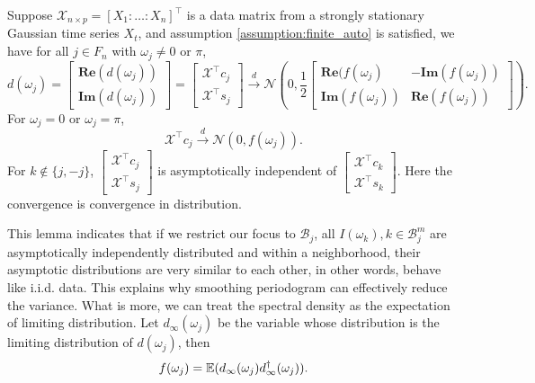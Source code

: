 \begin{lem}
\label{lemma:asy_dis_dft}
Suppose $\mathcal{\mathcal{X}}_{n\times p} = [X_1:\ldots:X_n]^\top$ is a data matrix from a strongly stationary  Gaussian time series $X_t$, and assumption \ref{assumption:finite_auto} is satisfied, we have for all $j\in F_n$ with $\omega_j \neq 0$ or $\pi$, 
\begin{equation}
\label{eq:limiting_dist}
d(\omega_j) = 
\begin{bmatrix}
\mathbf{Re}(d(\omega_j))\\
\mathbf{Im}(d(\omega_j))
\end{bmatrix}=
\begin{bmatrix} 
\mathcal{X}^\top c_j\\
\mathcal{X}^\top s_j
\end{bmatrix}  \overset{d}{\rightarrow} \mathcal{N}\left(0, \frac{1}{2}\begin{bmatrix}
\mathbf{Re}(f(\omega_j) & -\mathbf{Im}(f(\omega_j))\\
\mathbf{Im}(f(\omega_j)) & \mathbf{Re}(f(\omega_j))
\end{bmatrix}
\right).
\end{equation}
For $\omega_j = 0$ or $\omega_j = \pi$, 
\begin{equation}
\mathcal{X}^\top c_j
\overset{d}{\rightarrow} \mathcal{N}\left(0, f(\omega_j)
\right).
\end{equation}
For $k \notin \{j, -j\}$,  
$\begin{bmatrix}
\mathcal{X}^\top c_j\\
\mathcal{X}^\top s_j
\end{bmatrix}$ is asymptotically independent of 
$\begin{bmatrix}
\mathcal{X}^\top c_k\\
\mathcal{X}^\top s_k
\end{bmatrix} $. Here the convergence is convergence in distribution. 
\end{lem} 
This lemma indicates that if we restrict our focus to $\mathcal{B}_j$, all $I(\omega_k), k\in \mathcal{B}_j^m$ are asymptotically independently distributed and within a neighborhood, their asymptotic distributions are very similar to each other, in other words, behave like i.i.d. data. This explains why smoothing periodogram can effectively reduce the variance. What is more, we can treat the spectral density as the expectation of limiting distribution. Let 
$d_{\infty}(\omega_j)$ be the variable whose distribution is the limiting distribution of $d(\omega_j)$, then 
\[
f(\omega_j) = \mathbb{E}(d_{\infty}(\omega_j)d^\dag_{\infty}(\omega_j)).
\]

